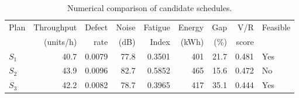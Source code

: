 \begin{table}[htbp]
\centering
\caption{Numerical comparison of candidate schedules.}
\label{tab:numerical-sim}
\small
\begin{tabular}{@{}lrrrrrrrl@{}}
\toprule
Plan & Throughput & Defect & Noise & Fatigue & Energy & Gap & V/R & Feasible \\
     & (units/h)  & rate   & (dB)  & Index   & (kWh)  & (\%) & score &         \\
\midrule
$S_{1}$ & 40.7 & 0.0079 & 77.8 & 0.3501 & 401 & 21.7 & 0.481 & Yes \\
$S_{2}$ & 43.9 & 0.0096 & 82.7 & 0.5852 & 465 & 15.6 & 0.472 & No \\
$S_{3}$ & 42.2 & 0.0082 & 78.7 & 0.3965 & 417 & 35.1 & 0.444 & Yes \\
\bottomrule
\end{tabular}
\end{table}
